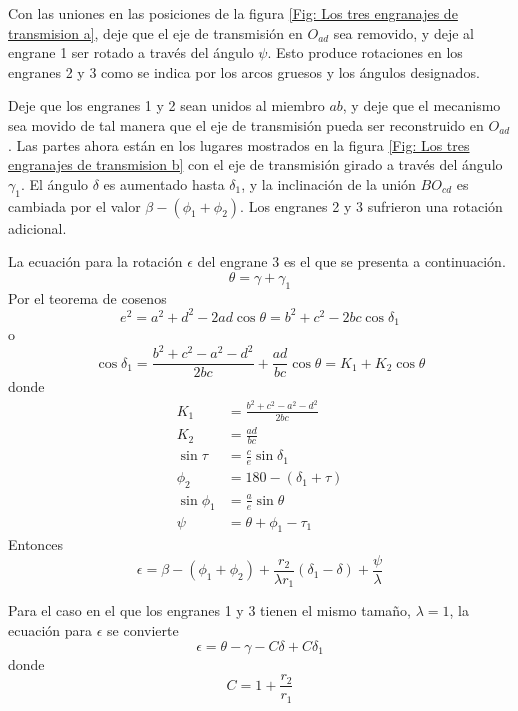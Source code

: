 \documentclass[12pt, final]{extarticle}
\begin{document}
Con las uniones en las posiciones de la figura
\ref{Fig: Los tres engranajes de transmision a}, deje que el eje de
transmisión en $O_{ad}$ sea removido, y deje al engrane 1 ser rotado a través
del ángulo $\psi$. Esto produce rotaciones en los engranes 2 y 3 como se indica
por los arcos gruesos y los ángulos designados.

Deje que los engranes 1 y 2 sean unidos al miembro $ab$, y deje que el mecanismo
sea movido de tal manera que el eje de transmisión pueda ser reconstruido en
$O_{ad}$. Las partes ahora están en los lugares mostrados en la figura
\ref{Fig: Los tres engranajes de transmision b} con el eje de transmisión
girado a través del ángulo $\gamma_{1}$. El ángulo $\delta$ es aumentado hasta
$\delta_{1}$, y la inclinación de la unión $BO_{cd}$ es cambiada por el valor
$\beta - (\phi_{1} + \phi_{2})$. Los engranes 2 y 3 sufrieron una rotación
adicional.

La ecuación para la rotación $\epsilon$ del engrane 3 es el que se presenta a
continuación.
\begin{equation}
    \theta = \gamma + \gamma_{1}
\end{equation}
Por el teorema de cosenos
\begin{equation}
    e^2 = a^2 + d^2 - 2ad\cos\theta = b^2 + c^2 - 2bc\cos\delta_{1}
\end{equation}
o
\begin{equation}
    \cos\delta_{1} = \frac{b^2 + c^2 - a^2 - d^2}{2bc} + \frac{ad}{bc}\cos\theta
    = K_{1} + K_{2}\cos\theta
    \label{Eq: cos delta1}
\end{equation}
donde
\begin{align}
    K_{1} &= \frac{b^2 + c^2 - a^2 - d^2}{2bc} \\
    K_{2} &= \frac{ad}{bc} \\
    \sin\tau &= \frac{c}{e}\sin\delta_{1} \\
    \phi_{2} &= 180 - (\delta_{1} + \tau) \\
    \sin\phi_{1} &= \frac{a}{e}\sin\theta \\
    \psi &= \theta + \phi_{1} - \tau_{1}
\end{align}
Entonces
\begin{equation}
    \epsilon = \beta - (\phi_{1} + \phi_{2})
    + \frac{r_{2}}{\lambda r_{1}}(\delta_{1} - \delta) + \frac{\psi}{\lambda}
\end{equation}

Para el caso en el que los engranes 1 y 3 tienen el mismo tamaño, $\lambda=1$,
la ecuación para $\epsilon$ se convierte
\begin{equation}
    \epsilon = \theta - \gamma - C\delta + C\delta_{1}
    \label{Eq: epsilon theta menos gamma}
\end{equation}
donde
\begin{equation}
    C = 1 + \frac{r_{2}}{r_{1}}
\end{equation}
\end{document}
